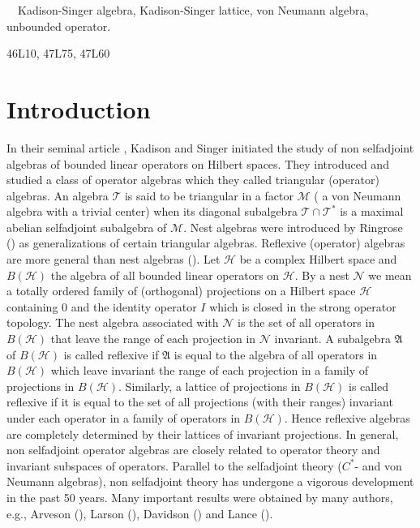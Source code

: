 \documentclass[12pt]{article}
\newcommand{\AAA}{\mathfrak A} \newcommand{\TTT}{\mathfrak T}
\newcommand{\HHH}{\mathcal H} %
\newcommand{\NNN}{\mathcal N} %
\begin{document}
{\vspace{2mm}
\baselineskip 12pt

 \ \ Kadison-Singer algebra,
Kadison-Singer lattice, von Neumann algebra, unbounded operator.

\vspace{2mm}\baselineskip 12pt

46L10, 47L75, 47L60

\baselineskip 16pt

\section{Introduction}

In their seminal article \cite{KS}, Kadison and Singer initiated the
study of non selfadjoint algebras of bounded linear operators on
Hilbert spaces.  They introduced and studied  a class of operator
algebras which they called triangular (operator) algebras. An
algebra $\mathcal{T}$ is said to be triangular  in a factor
$\mathcal{M}$ ( a von Neumann algebra with a trivial center) when
its diagonal subalgebra $\mathcal{T}\cap \mathcal{T}^*$ is a maximal
abelian selfadjoint subalgebra of $\mathcal{M}$. Nest algebras were
introduced by Ringrose (\cite{Ri}) as generalizations of certain
triangular algebras. Reflexive (operator) algebras are more general
than nest algebras (\cite{Ha}).  Let $\HHH$ be a complex Hilbert
space and $B(\HHH)$ the algebra of all bounded linear operators on
$\HHH$. By a nest $\NNN$ we mean a totally ordered family of
(orthogonal) projections on a Hilbert space $\HHH$ containing $0$
and the identity operator $I$ which is closed in the strong operator
topology. The nest algebra associated with $\NNN$ is the set of all
operators in $B(\HHH)$ that leave the range of each projection in
$\NNN$ invariant. A subalgebra $\AAA$ of $B(\HHH)$ is called
reflexive if $\AAA$ is equal to the algebra of all operators in
$B(\HHH)$ which leave invariant the range of each projection in a
family of projections in $B(\HHH)$. Similarly, a lattice of
projections in $B(\HHH)$ is called reflexive if it is equal to the
set of all projections (with their ranges) invariant under each
operator in a family of operators in $B(\HHH)$. Hence reflexive
algebras are completely determined by their lattices of invariant
projections. In general, non selfadjoint operator algebras are
closely related to operator theory and invariant subspaces of
operators. Parallel to the selfadjoint theory ($C^*$- and von
Neumann algebras), non selfadjoint theory has undergone a vigorous
development in the past 50 years. Many important results were
obtained by many authors, e.g., Arveson (\cite{Ar}), Larson
(\cite{La}), Davidson (\cite{Da}) and Lance (\cite{Lan}).


}
\end{document}
